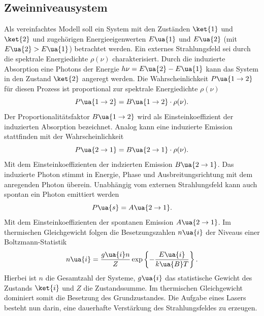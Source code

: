 \subsection{Zweinniveausystem}
Als vereinfachtes Modell soll ein System mit den Zuständen $\ket{1}$ und $\ket{2}$ und zugehörigen Energieeigenwerten
$E\ua{1}$ und $E\ua{2}$ (mit $E\ua{2}> E\ua{1}$) betrachtet werden. Ein externes Strahlungsfeld sei durch die spektrale Energiedichte $\rho(\nu)$
charakterisiert. Durch die induzierte Absorption eine Photons der Energie $h \nu = E\ua{2} - E\ua{1}$ kann das
System in den Zustand $\ket{2}$ angeregt werden. Die Wahrscheinlichkeit $P\ua{1\rightarrow 2}$ für diesen Prozess ist proportional
zur spektrale Energiedichte $\rho(\nu)$
\begin{equation}
  P\ua{1\rightarrow 2} = B\ua{1\rightarrow 2}\cdot\rho(\nu).
\end{equation}
Der Proportionalitätsfaktor $B\ua{1\rightarrow 2}$ wird als Einsteinkoeffizient der induzierten Absorption bezeichnet. Analog kann
eine induzierte Emission stattfinden mit der Wahrscheinlichkeit
\begin{equation}
  P\ua{2\rightarrow 1} = B\ua{2\rightarrow 1}\cdot\rho(\nu).
\end{equation}
Mit dem Einsteinkoeffizienten der indzierten Emission $B\ua{2\rightarrow1}$.
Das induzierte Photon stimmt in Energie, Phase und Ausbreitungsrichtung mit dem anregenden Photon überein.
Unabhängig vom externen Strahlungsfeld
kann auch spontan ein Photon emittiert werden
\begin{equation}
  P\ua{s} = A\ua{2 \rightarrow 1}.
\end{equation}
Mit dem Einsteinkoeffizienten der spontanen Emission $A\ua{2 \rightarrow 1}$. Im thermischen Gleichgewicht folgen die Besetzungszahlen
$n\ua{i}$ der Niveaus einer Boltzmann-Statistik
\begin{equation}
  n\ua{i} = \frac{g\ua{i}n}{Z}\exp\left\{-\frac{E\ua{i}}{k\ua{B}T}\right\}.
\end{equation}
Hierbei ist $n$ die Gesamtzahl der Systeme, $g\ua{i}$ das statistische Gewicht des Zustands $\ket{i}$ und $Z$ die Zustandssumme. Im thermischen
Gleichgewicht dominiert somit die Besetzung des Grundzustandes. Die Aufgabe eines Lasers besteht nun darin,
eine dauerhafte Verstärkung des Strahlungsfeldes zu erzeugen.

